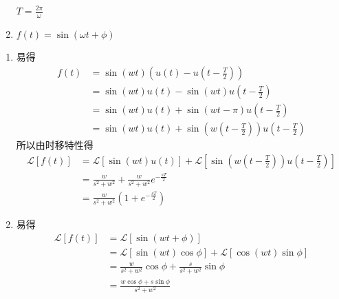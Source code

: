 \documentclass[answers]{exam}  %
\begin{document}
\begin{questions}
\begin{enumerate}[(1)]
$T=\frac{2\pi}{\omega}$
\item $f(t)=\sin(\omega t+\phi)$
\end{enumerate}
\begin{solution}
\begin{enumerate}[(1)]
	\item 易得\begin{align*}
		f(t)&=\sin(wt)(u(t)-u(t-\frac{T}{2}))\\&=\sin(wt)u(t)-\sin(wt)u(t-\frac{T}{2})\\
		&=\sin(wt)u(t)+\sin(wt-\pi)u(t-\frac{T}{2})\\
		&=\sin(wt)u(t)+\sin(w(t-\frac{T}{2}))u(t-\frac{T}{2})
	\end{align*}
    所以由时移特性得\begin{align*}
    	\mathcal{L}[f(t)]&=\mathcal{L}[\sin(wt)u(t)]+\mathcal{L}[\sin(w(t-\frac{T}{2}))u(t-\frac{T}{2})]\\
    	&=\frac{w}{s^2+w^2}+\frac{w}{s^2+w^2}e^{-\frac{sT}{2}}\\
    	&=\frac{w}{s^2+w^2}(1+e^{-\frac{sT}{2}})
    \end{align*}
    \item 易得\begin{align*}
    	\mathcal{L}[f(t)]&=\mathcal{L}[\sin(wt+\phi)]\\
    	&=\mathcal{L}[\sin(wt)\cos\phi]+\mathcal{L}[\cos(wt)\sin\phi]\\
    	&=\frac{w}{s^2+w^2}\cos\phi+\frac{s}{s^2+w^2}\sin\phi\\
    	&=\frac{w\cos\phi+s\sin\phi}{s^2+w^2}
    \end{align*}
\end{enumerate}
\end{solution}


\end{questions}
\end{document}
